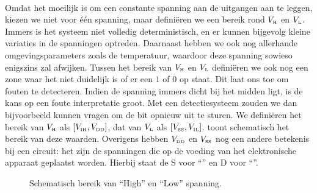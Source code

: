 \paragraph{}
Omdat het moeilijk is om een constante spanning aan de uitgangen aan te leggen, kiezen we niet voor \'e\'en spanning, maar defini\"eren we een bereik rond $V_{\mbox{\tiny H}}$ en $V_{\mbox{\tiny L}}$. Immers is het systeem niet volledig deterministisch, en er kunnen bijgevolg kleine variaties in de spanningen optreden. Daarnaast hebben we ook nog allerhande omgevingsparameters zoals de temperatuur, waardoor deze spanning sowieso enigszins zal afwijken. Tussen het bereik van $V_{\mbox{\tiny H}}$ en $V_{\mbox{\tiny L}}$ defini\"eren we ook nog een zone waar het niet duidelijk is of er een $1$ of $0$ op staat. Dit laat ons toe om fouten te detecteren. Indien de spanning immers dicht bij het midden ligt, is de kans op een foute interpretatie groot. Met een detectiesysteem zouden we dan bijvoorbeeld kunnen vragen om de bit opnieuw uit te sturen. We defini\"eren het bereik van $V_{\mbox{\tiny H}}$ als $\left[V_{\mbox{\tiny IH}},V_{\mbox{\tiny DD}}\right]$, dat van $V_{\mbox{\tiny L}}$ als $\left[V_{\mbox{\tiny SS}},V_{\mbox{\tiny IL}}\right]$.  toont schematisch het bereik van deze waarden. Overigens hebben $V_{\mbox{\tiny DD}}$ en $V_{\mbox{\tiny SS}}$ nog een andere betekenis bij een circuit: het zijn de spanningen die op de voeding van het elektronische apparaat geplaatst worden. Hierbij staat de S voor ``'' en D voor ``''.

\begin{figure}[hbt]
\centering
{}
\caption{Schematisch bereik van ``High'' en ``Low'' spanning.}
\end{figure}

